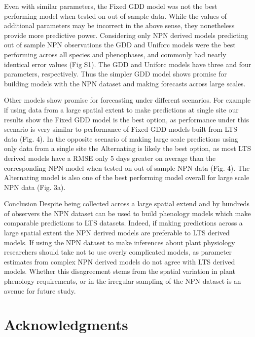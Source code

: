 \documentclass[fleqn,10pt,lineno]{wlpeerj} %
\begin{document}
Even with similar parameters, the Fixed GDD model was not the best performing model when tested on out of sample data. While the values of additional parameters may be incorrect in the above sense, they nonetheless provide more predictive power. Considering only NPN derived models predicting out of sample NPN observations the GDD and Uniforc models were the best performing across all species and phenophases, and commonly had nearly identical error values (Fig S1). The GDD and Uniforc models have three and four parameters, respectively. Thus the simpler GDD model shows promise for building models with the NPN dataset and making forecasts across large scales.

Other models show promise for forecasting under different scenarios. For example if using data from a large spatial extent to make predictions at single site our results show the Fixed GDD model is the best option, as performance under this scenario is very similar to performance of Fixed GDD models built from LTS data (Fig. 4). In the opposite scenario of making large scale predictions using only data from a single site the Alternating is likely the best option, as most LTS derived models have a RMSE only 5 days greater on average than the corresponding NPN model when tested on out of sample NPN data (Fig. 4). The Alternating model is also one of the best performing model overall for large scale NPN data (Fig. 3a). 

Conclusion
Despite being collected across a large spatial extend and by hundreds of observers the NPN dataset can be used to build phenology models which make comparable predictions to LTS datasets. Indeed, if making predictions across a large spatial extent the NPN derived models are preferable to LTS derived models. If using the NPN dataset to make inferences about plant physiology researchers should take not to use overly complicated models, as parameter estimates from complex NPN derived models do not agree with LTS derived models. Whether this disagreement stems from the spatial variation in plant phenology requirements, or in the irregular sampling of the NPN dataset is an avenue for future study. 

\section*{Acknowledgments}



\end{document}
